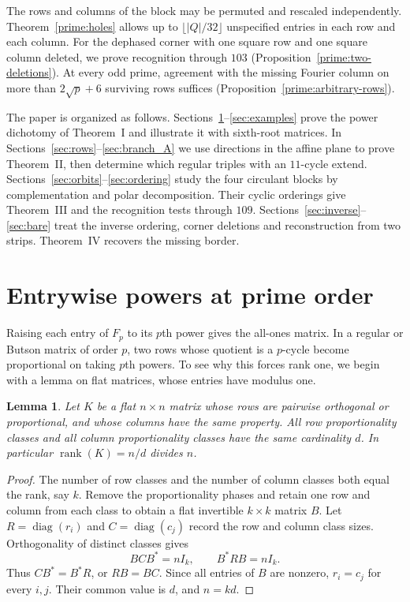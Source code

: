 \documentclass[11pt,a4paper]{article}
\newtheorem{lemma}[theorem]{Lemma}
\numberwithin{equation}{section}
\begin{document}
The rows and columns of the block may be permuted and rescaled independently. Theorem~\ref{prime:holes} allows up to $\lfloor |Q|/32\rfloor$ unspecified entries in each row and each column. For the dephased corner with one square row and one square column deleted, we prove recognition through $103$ (Proposition~\ref{prime:two-deletions}). At every odd prime, agreement with the missing Fourier column on more than $2\sqrt p+6$ surviving rows suffices (Proposition~\ref{prime:arbitrary-rows}).

\medskip
The paper is organized as follows. Sections~\ref{sec:powers}--\ref{sec:examples} prove the power dichotomy of Theorem~I and illustrate it with sixth-root matrices. In Sections~\ref{sec:rows}--\ref{sec:branch_A} we use directions in the affine plane to prove Theorem~II, then determine which regular triples with an $11$-cycle extend. Sections~\ref{sec:orbits}--\ref{sec:ordering} study the four circulant blocks by complementation and polar decomposition. Their cyclic orderings give Theorem~III and the recognition tests through $109$. Sections~\ref{sec:inverse}--\ref{sec:bare} treat the inverse ordering, corner deletions and reconstruction from two strips. Theorem~IV recovers the missing border.

\section{Entrywise powers at prime order}\label{sec:powers}

Raising each entry of $F_p$ to its $p$th power gives the all-ones matrix. In a regular or Butson matrix of order $p$, two rows whose quotient is a $p$-cycle become proportional on taking $p$th powers. To see why this forces rank one, we begin with a lemma on flat matrices, whose entries have modulus one.

\begin{lemma}\label{n11_A_completion:blocks}
Let $K$ be a flat $n\times n$ matrix whose rows are pairwise orthogonal or proportional, and whose columns have the same property. All row proportionality classes and all column proportionality classes have the same cardinality $d$. In particular $\operatorname{rank}(K)=n/d$ divides $n$.
\end{lemma}

\begin{proof}
The number of row classes and the number of column classes both equal the rank, say $k$. Remove the proportionality phases and retain one row and column from each class to obtain a flat invertible $k\times k$ matrix $B$. Let $R=\operatorname{diag}(r_i)$ and $C=\operatorname{diag}(c_j)$ record the row and column class sizes. Orthogonality of distinct classes gives
$$BCB^*=nI_k,\qquad B^*RB=nI_k.$$
Thus $CB^*=B^*R$, or $RB=BC$. Since all entries of $B$ are nonzero, $r_i=c_j$ for every $i,j$. Their common value is $d$, and $n=kd$.
\end{proof}
\end{document}
